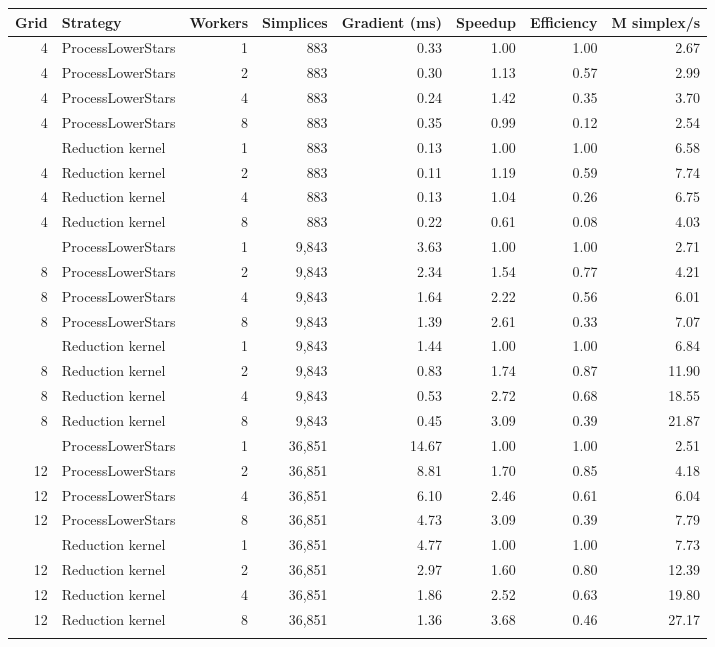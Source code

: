 \begin{tabular}{rlrrrrrr}
\toprule
Grid & Strategy & Workers & Simplices & Gradient (ms) & Speedup & Efficiency & M simplex/s \\
\midrule
4 & ProcessLowerStars & 1 & 883 & 0.33 & 1.00 & 1.00 & 2.67 \\
4 & ProcessLowerStars & 2 & 883 & 0.30 & 1.13 & 0.57 & 2.99 \\
4 & ProcessLowerStars & 4 & 883 & 0.24 & 1.42 & 0.35 & 3.70 \\
4 & ProcessLowerStars & 8 & 883 & 0.35 & 0.99 & 0.12 & 2.54 \\
\addlinespace
4 & Reduction kernel & 1 & 883 & 0.13 & 1.00 & 1.00 & 6.58 \\
4 & Reduction kernel & 2 & 883 & 0.11 & 1.19 & 0.59 & 7.74 \\
4 & Reduction kernel & 4 & 883 & 0.13 & 1.04 & 0.26 & 6.75 \\
4 & Reduction kernel & 8 & 883 & 0.22 & 0.61 & 0.08 & 4.03 \\
\addlinespace
8 & ProcessLowerStars & 1 & 9,843 & 3.63 & 1.00 & 1.00 & 2.71 \\
8 & ProcessLowerStars & 2 & 9,843 & 2.34 & 1.54 & 0.77 & 4.21 \\
8 & ProcessLowerStars & 4 & 9,843 & 1.64 & 2.22 & 0.56 & 6.01 \\
8 & ProcessLowerStars & 8 & 9,843 & 1.39 & 2.61 & 0.33 & 7.07 \\
\addlinespace
8 & Reduction kernel & 1 & 9,843 & 1.44 & 1.00 & 1.00 & 6.84 \\
8 & Reduction kernel & 2 & 9,843 & 0.83 & 1.74 & 0.87 & 11.90 \\
8 & Reduction kernel & 4 & 9,843 & 0.53 & 2.72 & 0.68 & 18.55 \\
8 & Reduction kernel & 8 & 9,843 & 0.45 & 3.09 & 0.39 & 21.87 \\
\addlinespace
12 & ProcessLowerStars & 1 & 36,851 & 14.67 & 1.00 & 1.00 & 2.51 \\
12 & ProcessLowerStars & 2 & 36,851 & 8.81 & 1.70 & 0.85 & 4.18 \\
12 & ProcessLowerStars & 4 & 36,851 & 6.10 & 2.46 & 0.61 & 6.04 \\
12 & ProcessLowerStars & 8 & 36,851 & 4.73 & 3.09 & 0.39 & 7.79 \\
\addlinespace
12 & Reduction kernel & 1 & 36,851 & 4.77 & 1.00 & 1.00 & 7.73 \\
12 & Reduction kernel & 2 & 36,851 & 2.97 & 1.60 & 0.80 & 12.39 \\
12 & Reduction kernel & 4 & 36,851 & 1.86 & 2.52 & 0.63 & 19.80 \\
12 & Reduction kernel & 8 & 36,851 & 1.36 & 3.68 & 0.46 & 27.17 \\
\addlinespace
\bottomrule
\end{tabular}
